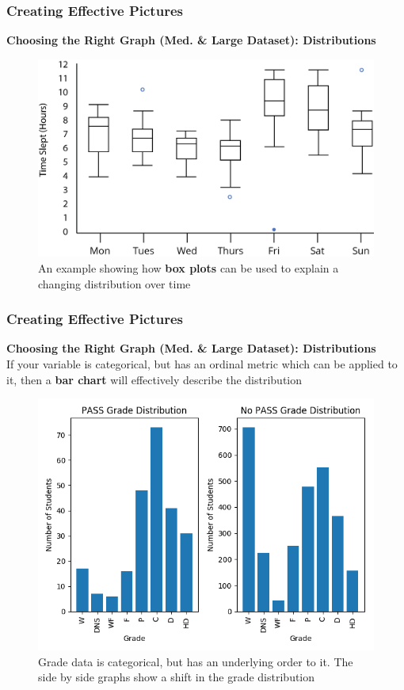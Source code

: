 \documentclass{beamer}
\begin{document}
\begin{frame}
\frametitle{Creating Effective Pictures}
\textbf{Choosing the Right Graph (Med. \& Large Dataset): Distributions}\\
\begin{figure}
\includegraphics[scale=0.6]{box_time}
\caption{An example showing how \textbf{box plots} can be used to explain a changing distribution over time}
\end{figure}
\end{frame}


\begin{frame}
\frametitle{Creating Effective Pictures}
\textbf{Choosing the Right Graph (Med. \& Large Dataset): Distributions}\\
\vspace{0.3cm}
If your variable is categorical, but has an ordinal metric which can be applied to it, then a \textbf{bar chart} will effectively describe the distribution
\begin{figure}
\includegraphics[scale=0.4]{grade_dist_3}
\vspace{-0.3cm}
\caption{Grade data is categorical, but has an underlying order to it. The side by side graphs show a shift in the grade distribution}
\end{figure}
\end{frame}
\end{document}
